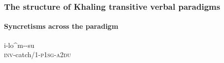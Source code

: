 \begin{frame} 
\frametitle{The structure of  Khaling transitive verbal paradigms} 
\framesubtitle{Syncretisms across the paradigm \cite{jacques12khaling}}


\begin{center}\small
{{\textglotstop}i-{lo\^{\textopeno}m}-{\ng}{\textturnv}-su}\\
\textsc{inv}-catch/\textsc{1}-\textsc{p1sg}-\textsc{a2du}\\
\end{center}

\begin{table}[H]
\end{table}
\end{frame}
